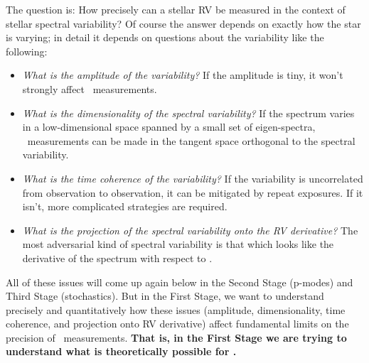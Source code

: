 \documentclass[12pt, letterpaper]{article}
\begin{document}
The question is: How precisely can a stellar RV be measured in the context
of stellar spectral variability?
Of course the answer depends on exactly how the star is varying;
in detail it depends on questions about the variability like the following:
\begin{itemize}
\item
\emph{What is the amplitude of the variability?}
If the amplitude is tiny, it won't strongly affect \RV\ measurements.
\item
\emph{What is the dimensionality of the spectral variability?}
If the spectrum varies in a low-dimensional space spanned by a small set
of eigen-spectra, \EPRV\ measurements can be made in the tangent space
orthogonal to the spectral variability.
\item
\emph{What is the time coherence of the variability?}
If the variability is uncorrelated from observation to observation, it
can be mitigated by repeat exposures. If it isn't, more complicated
strategies are required.
\item
\emph{What is the projection of the spectral variability onto the RV derivative?}
The most adversarial kind of spectral variability is that which looks
like the derivative of the spectrum with respect to \RV.
\end{itemize}

\noindent
All of these issues will come up again below in the Second Stage (p-modes)
and Third Stage (stochastics).
But in the First Stage, we want to understand precisely and quantitatively
how these issues (amplitude, dimensionality, time coherence, and projection
onto RV derivative) affect fundamental limits on the precision of
\EPRV\ measurements.
\textbf{That is, in the First Stage we are trying to understand what is theoretically
possible for \EPRV.}
\end{document}
